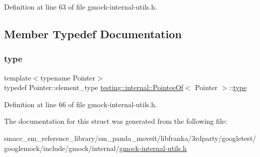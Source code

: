 Definition at line 63 of file gmock-\/internal-\/utils.\+h.



\subsection{Member Typedef Documentation}
\mbox{\label{structtesting_1_1internal_1_1PointeeOf_aca4d92c8f978e47a8695e82cffc11837}} 
\subsubsection{\texorpdfstring{type}{type}}
{\footnotesize\ttfamily template$<$typename Pointer$>$ \\
typedef Pointer\+::element\+\_\+type \hyperlink{structtesting_1_1internal_1_1PointeeOf}{testing\+::internal\+::\+Pointee\+Of}$<$ Pointer $>$\+::\hyperlink{structtesting_1_1internal_1_1PointeeOf_aca4d92c8f978e47a8695e82cffc11837}{type}}



Definition at line 66 of file gmock-\/internal-\/utils.\+h.



The documentation for this struct was generated from the following file\+:\begin{DoxyCompactItemize}
\item 
smacc\+\_\+sm\+\_\+reference\+\_\+library/sm\+\_\+panda\+\_\+moveit/libfranka/3rdparty/googletest/googlemock/include/gmock/internal/\hyperlink{gmock-internal-utils_8h}{gmock-\/internal-\/utils.\+h}\end{DoxyCompactItemize}
